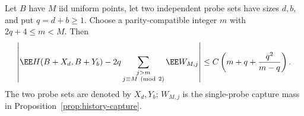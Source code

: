 \documentclass[11pt,letterpaper]{article}
\begin{document}
\begin{proposition}
\label{prop:early-history-linearization}
Let $B$ have $M$ iid uniform points, let two independent probe sets
have sizes $d,b$, and put $q=d+b\ge1$. Choose a parity-compatible
integer $m$ with $2q+4\le m<M$. Then
\begin{equation}\label{eq:early-history-linearization}
 \left|\EE H(B+X_d,B+Y_b)
          -2q\sum_{\substack{j>m\\j\equiv M\ ({\rm mod}\ 2)}}
                         \EE W_{M,j}\right|
 \le C\left(m+q+\frac{q^2}{m-q}\right).
\end{equation}
The two probe sets are denoted by $X_d,Y_b$; $W_{M,j}$ is the
single-probe capture mass in Proposition~\ref{prop:history-capture}.
\end{proposition}
\end{document}
